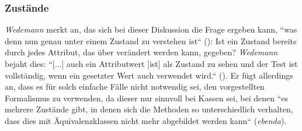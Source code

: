 \subsubsection*{Zustände}
\textit{Wedemann} merkt an, das sich bei dieser Diskussion die Frage ergeben kann, ``was denn nun genau unter einem Zustand zu verstehen ist`` (\cite[48]{Wed09c}): Ist ein Zustand bereits durch jedes Attribut, das über  verändert werden kann, gegeben? \textit{Wedemann} bejaht dies: ``[...] auch ein Attributwert [ist] als Zustand zu sehen und der Test ist vollständig, wenn ein gesetzter Wert auch verwendet wird.`` (\cite[48]{Wed09c}).
Er fügt allerdings an, dass es für solch einfache Fälle nicht notwendig sei, den vorgestellten Formalismus zu verwenden, da dieser nur sinnvoll bei Kassen sei, bei denen ``es mehrere Zustände gibt, in denen sich die Methoden so unterschiedlich verhalten, dass dies mit Äquivalenzklassen nicht mehr abgebildet werden kann`` (\textit{ebenda}).